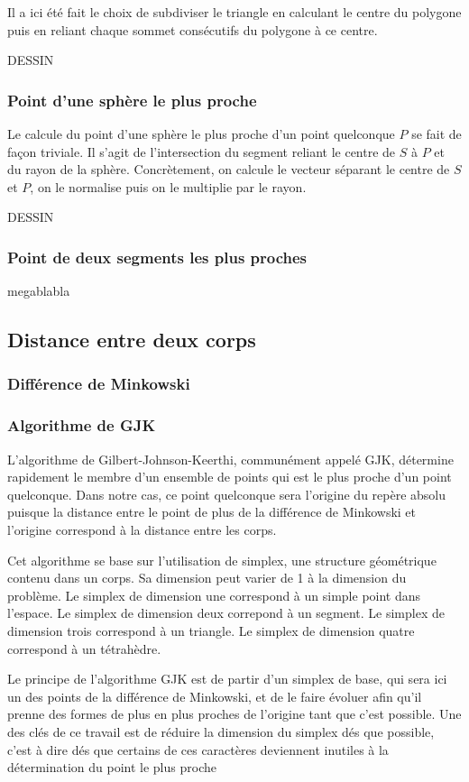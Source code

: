 Il a ici été fait le choix de subdiviser le triangle en calculant le centre du polygone puis en reliant chaque sommet consécutifs du polygone à ce centre.

DESSIN

\subsubsection{Point d'une sphère le plus proche}

Le calcule du point d'une sphère le plus proche d'un point quelconque $P$ se fait de façon triviale. Il s'agit de l'intersection du segment reliant le centre de $S$ à $P$ et du rayon de la sphère. Concrètement, on calcule le vecteur séparant le centre de $S$ et $P$, on le normalise puis on le multiplie par le rayon.

DESSIN

\subsubsection{Point de deux segments les plus proches}

megablabla 

\subsection{Distance entre deux corps}

\subsubsection{Différence de Minkowski}

\subsubsection{Algorithme de GJK}

L'algorithme de Gilbert-Johnson-Keerthi, communément appelé GJK, détermine rapidement le membre d'un ensemble de points qui est le plus proche d'un point quelconque. Dans notre cas, ce point quelconque sera l'origine du repère absolu puisque la distance entre le point de plus de la différence de Minkowski et l'origine correspond à la distance entre les corps.

Cet algorithme se base sur l'utilisation de simplex, une structure géométrique contenu dans un corps. Sa dimension peut varier de 1 à la dimension du problème. Le simplex de dimension une correspond à un simple point dans l'espace. Le simplex de dimension deux correpond à un segment. Le simplex de dimension trois correspond à un triangle. Le simplex de dimension quatre correspond à un tétrahèdre.

Le principe de l'algorithme GJK est de partir d'un simplex de base, qui sera ici un des points de la différence de Minkowski, et de le faire évoluer afin qu'il prenne des formes de plus en plus proches de l'origine tant que c'est possible. Une des clés de ce travail est de réduire la dimension du simplex dés que possible, c'est à dire dés que certains de ces caractères deviennent inutiles à la détermination du point le plus proche
